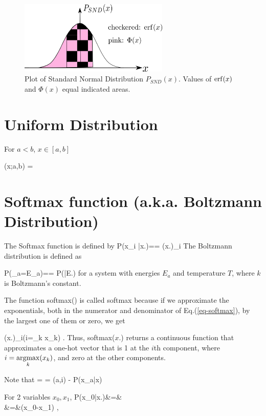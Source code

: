 \begin{figure}[h!]
\centering
\includegraphics[width=2.8in]
{conventions/erf.png}
\caption{Plot of Standard
Normal Distribution $P_{SND}(x)$.
 Values of ${\rm erf}(x)$ and $\Phi(x)$
 equal indicated areas.}
 \label{fig-erf}
\end{figure}
\section{Uniform Distribution}
For $a<b$, $x\in [a,b]$

\beq
\calu(x;a,b) =
\eeq

\section {Softmax function
(a.k.a. Boltzmann Distribution)}

The Softmax function
 is defined by
\beq
P(x_i
|x.)==
\softmax(x.)_i
\label{eq-softmax}
\eeq
The
Boltzmann distribution is defined as

\beq
P(\rvE_a=E_a)==
P(|E.)\eeq
for a system with energies $E_a$
and temperature $T$,
where $k$
is Boltzmann's constant.

The function
softmax() is called softmax because if we
approximate the exponentials,
 both in the numerator and denominator
of Eq.(\ref{eq-softmax}),
by the largest one
of them or zero,
we get

\beq
\softmax(x.)_i\approx \indi(i=\argmax_k x_k)
\;.
\eeq
Thus, softmax($x.$)
returns a continuous
function that approximates a one-hot vector
that is 1 at the
$i$th
component, where
$i=\mathop{\mathrm{argmax}}\limits_k(x_k)$,
and zero at the other components.

Note that
\beq
{}
=
\ln{}
=
\delta(a,i)
-
P(x_a|x)
\eeq

For 2 variables $x_0, x_1$,
\beqa
P(x_0|x.)&=&
\\
&=&\smoid(x_0-x_1)
\;,
\eeqa

